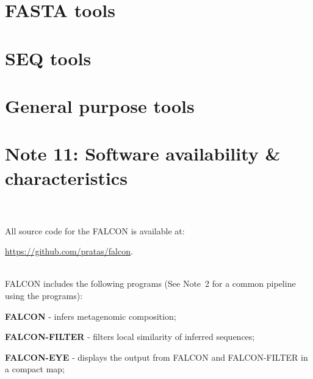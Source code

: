 \documentclass[11pt,journal,compsoc]{report}[1]
\begin{document}
\chapter*{FASTA tools}



\chapter*{SEQ tools}

\chapter*{General purpose tools}



\chapter*{Note 11: Software availability \& characteristics}
\label{C-SOFTWARE}

~\\
~\\
All source code for the FALCON is available at:
\begin{itemize}
\begin{sloppypar}
\item \url{https://github.com/pratas/falcon}.
\end{sloppypar}
\end{itemize}
~\\
FALCON includes the following programs (See Note~2 for a common pipeline using 
the programs):
\begin{enumerate}
\begin{sloppypar}
\item \textbf{FALCON} - infers metagenomic composition;
\item \textbf{FALCON-FILTER} - filters local similarity of inferred sequences;
\item \textbf{FALCON-EYE} - displays the output from FALCON and FALCON-FILTER in 
a compact map;
\end{sloppypar}
\end{enumerate}
\end{document}
